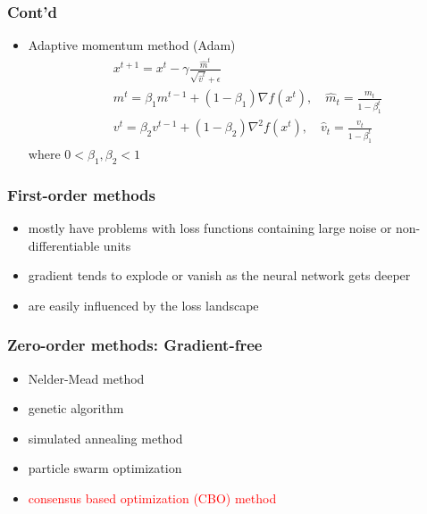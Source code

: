 \documentclass{beamer}
\begin{document}
\begin{frame}
\frametitle{Cont'd}

\begin{itemize}
	\item Adaptive momentum method (Adam)  
	\begin{align*}
	&x^{t+1} = x^t - \gamma \frac{\hat{m}^t}{\sqrt{\hat{v}^t}+\epsilon}\\
	&m^t = \beta_1 m^{t-1} + (1-\beta_1) \nabla f(x^t), \quad \hat{m}_t = \frac{m_t}{1-\beta_1^t}\\
	&v^t = \beta_2 v^{t-1} + (1-\beta_2) \nabla^2 f(x^t), \quad \hat{v}_t = \frac{v_t}{1-\beta_1^t}
	\end{align*}
	where $0<\beta_1,\beta_2<1$
\end{itemize}
\end{frame}

\begin{frame}
\frametitle{First-order methods}

\begin{itemize}
	\item mostly have problems with loss functions containing large noise or non-differentiable units
	\item gradient tends to explode or vanish as the neural network gets deeper
	\item are easily influenced by the loss landscape
\end{itemize}

\end{frame}

\begin{frame}
	\frametitle{Zero-order methods: Gradient-free}
	
	\begin{itemize}
		\item Nelder-Mead method
		\item genetic algorithm
		\item simulated annealing method
		\item particle swarm optimization
		\item \textcolor{red}{consensus based optimization (CBO) method} 
	\end{itemize}
\end{frame}
\end{document}
